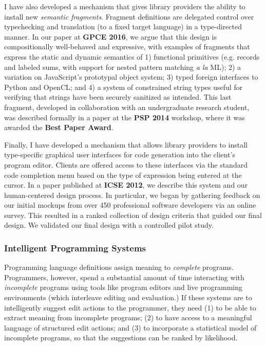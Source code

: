 \documentclass[10pt]{article}
\begin{document}
I have also developed a mechanism that gives library providers the ability to install new \emph{semantic fragments}. Fragment definitions are delegated control over typechecking and translation (to a fixed target language) in a type-directed manner. In our paper at \textbf{GPCE 2016}, we argue that this design is compositionally well-behaved and expressive, with examples of
fragments that express the static and dynamic semantics of
1) functional primitives (e.g. records and labeled sums, with support for nested pattern
matching \emph{a la} ML); 2) a variation on JavaScript's prototypal
object system; 3) typed foreign interfaces to Python and
OpenCL; and 4) a system of constrained string types useful for verifying that strings have been securely sanitized as intended. This last fragment, developed in collaboration with an undergraduate research student, was described formally in a paper at the \textbf{PSP 2014} workshop, where it was awarded the \textbf{Best Paper Award}.

Finally, I have developed a mechanism that allows library providers to install type-specific {graphical user interfaces} for code generation into the client's program editor. Clients are offered access to these interfaces via the standard code completion menu based on the type of expression being entered at the cursor. In a paper published at \textbf{ICSE 2012}, we describe this system and our human-centered design process. In particular, we began by gathering feedback on our initial mockups from over 450 professional software developers via an online survey. This resulted in a ranked collection of design criteria that guided our final design. We validated our final design with a controlled pilot study.

\subsubsection*{Intelligent Programming Systems}
Programming language definitions assign meaning to \emph{complete} programs. 
Programmers, however, spend a substantial amount of time interacting with \emph{incomplete} programs using tools like program editors and live programming environments (which interleave editing and evaluation.) If these systems are to intelligently suggest edit actions to the programmer, they need (1) to be able to extract meaning from incomplete programs; (2) to have access to a meaningful language of structured edit actions; and (3) to incorporate a statistical model of incomplete programs, so that the suggestions can be ranked by likelihood.
\end{document}
